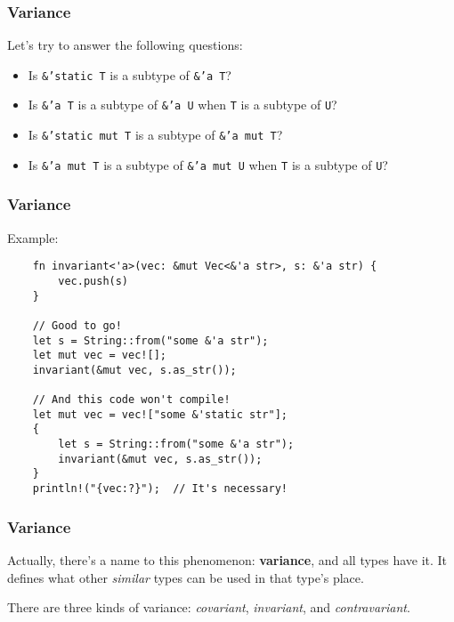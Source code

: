 \documentclass[aspectratio=1610,t]{beamer}
\begin{document}
\begin{frame}[fragile]
\frametitle{Variance}
Let's try to answer the following questions:

\begin{itemize}
    \item<1-> Is \texttt{\&'static T} is a subtype of \texttt{\&'a T}? 
    \item<3-> Is \texttt{\&'a T} is a subtype of \texttt{\&'a U} when \texttt{T} is a subtype of \texttt{U}? 
    \item<5-> Is \texttt{\&'static mut T} is a subtype of \texttt{\&'a mut T}? 
    \item<7-> Is \texttt{\&'a mut T} is a subtype of \texttt{\&'a mut U} when \texttt{T} is a subtype of \texttt{U}? 
    
\end{itemize}
\end{frame}


\begin{frame}[fragile,c]
\frametitle{Variance}
Example:

\begin{verbatim}
    fn invariant<'a>(vec: &mut Vec<&'a str>, s: &'a str) {
        vec.push(s)
    }

    // Good to go!
    let s = String::from("some &'a str");
    let mut vec = vec![];
    invariant(&mut vec, s.as_str());

    // And this code won't compile!
    let mut vec = vec!["some &'static str"];
    {
        let s = String::from("some &'a str");
        invariant(&mut vec, s.as_str());
    }
    println!("{vec:?}");  // It's necessary!
\end{verbatim}
\end{frame}


\begin{frame}[fragile]
\frametitle{Variance}
Actually, there's a name to this phenomenon: \textbf{variance}, and all types have it. It defines what other \textit{similar} types can be used in that type's place.

There are three kinds of variance: \textit{covariant}, \textit{invariant}, and \textit{contravariant}.
\end{frame}
\end{document}
